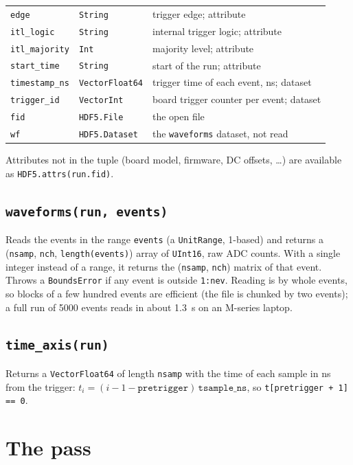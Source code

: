 \documentclass[11pt]{article}
\newcommand{\code}[1]{\texttt{#1}}
\begin{document}
\begin{longtable}{l l p{78mm}}
\code{edge} & \code{String} & trigger edge; attribute \\
\code{itl\_logic} & \code{String} & internal trigger logic; attribute \\
\code{itl\_majority} & \code{Int} & majority level; attribute \\
\code{start\_time} & \code{String} & start of the run; attribute \\
\code{timestamp\_ns} & \code{Vector{Float64}} & trigger time of each event, ns; dataset \\
\code{trigger\_id} & \code{Vector{Int}} & board trigger counter per event; dataset \\
\code{fid} & \code{HDF5.File} & the open file \\
\code{wf} & \code{HDF5.Dataset} & the \code{waveforms} dataset, not read \\
\bottomrule
\end{longtable}

Attributes not in the tuple (board model, firmware, DC offsets, \dots) are
available as \code{HDF5.attrs(run.fid)}.

\subsection{\code{waveforms(run, events)}}

Reads the events in the range \code{events} (a \code{UnitRange}, 1-based)
and returns a (\code{nsamp}, \code{nch}, \code{length(events)}) array of
\code{UInt16}, raw ADC counts. With a single integer instead of a range, it
returns the (\code{nsamp}, \code{nch}) matrix of that event. Throws a
\code{BoundsError} if any event is outside \code{1:nev}. Reading is by whole
events, so blocks of a few hundred events are efficient (the file is chunked
by two events); a full run of 5000 events reads in about 1.3~s on an M-series
laptop.

\subsection{\code{time\_axis(run)}}

Returns a \code{Vector{Float64}} of length \code{nsamp} with the time of each
sample in ns from the trigger: $t_i = (i - 1 - \code{pretrigger})\,
\code{tsample\_ns}$, so \code{t[pretrigger + 1] == 0}.

\section{The pass}
\label{sec:pass}
\end{document}
